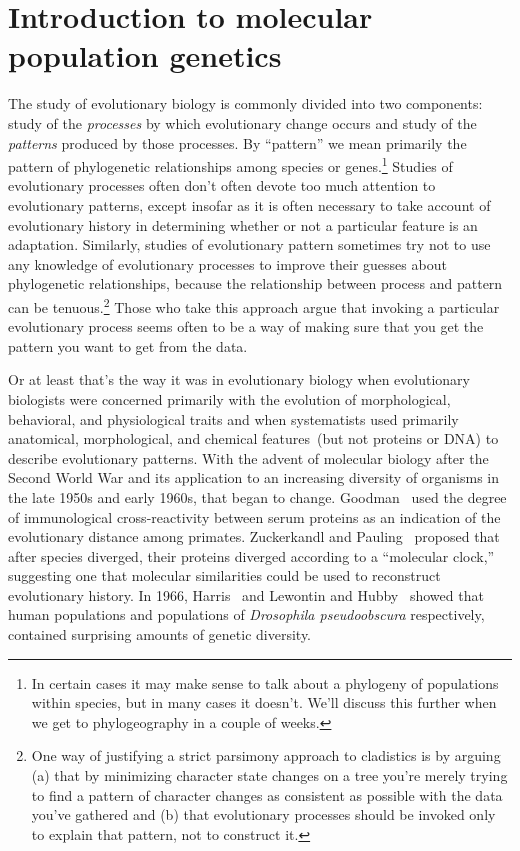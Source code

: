 \chapter{Introduction to molecular population genetics}

The study of evolutionary biology is commonly divided into two
components: study of the {\it processes\/} by which evolutionary
change occurs and study of the {\it patterns\/} produced by those
processes. By ``pattern'' we mean primarily the pattern of
phylogenetic relationships among species or genes.\footnote{In certain
  cases it may make sense to talk about a phylogeny of populations
  within species, but in many cases it doesn't. We'll discuss this
  further when we get to phylogeography in a couple of weeks.} Studies
of evolutionary processes often don't often devote too much attention
to evolutionary patterns, except insofar as it is often necessary to
take account of evolutionary history in determining whether or not a
particular feature is an adaptation. Similarly, studies of
evolutionary pattern sometimes try not to use any knowledge of
evolutionary processes to improve their guesses about phylogenetic
relationships, because the relationship between process and pattern
can be tenuous.\footnote{One way of justifying a strict parsimony
  approach to cladistics is by arguing (a) that by minimizing
  character state changes on a tree you're merely trying to find a
  pattern of character changes as consistent as possible with the data
  you've gathered and (b) that evolutionary processes should be
  invoked only to explain that pattern, not to construct it.} Those
who take this approach argue that invoking a particular evolutionary
process seems often to be a way of making sure that you get the
pattern you want to get from the data.

Or at least that's the way it was in evolutionary biology when
evolutionary biologists were concerned primarily with the evolution of
morphological, behavioral, and physiological traits and when
systematists used primarily anatomical, morphological, and chemical
features~(but not proteins or DNA) to describe evolutionary
patterns. With the advent of molecular biology after the Second World
War and its application to an increasing diversity of organisms in the
late 1950s and early 1960s, that began to
change. Goodman~\cite{Goodman62} used the degree of immunological
cross-reactivity between serum proteins as an indication of the
evolutionary distance among primates. Zuckerkandl and
Pauling~\cite{Zuckerkandl-Pauling65} proposed that after species
diverged, their proteins diverged according to a ``molecular clock,''
suggesting one that molecular similarities could be used to
reconstruct evolutionary history. In 1966, Harris~\cite{Harris66} and
Lewontin and Hubby~\cite{Hubby-Lewontin66,Lewontin-Hubby66} showed
that human populations and populations of {\it Drosophila
  pseudoobscura\/} respectively, contained surprising amounts of
genetic diversity.

